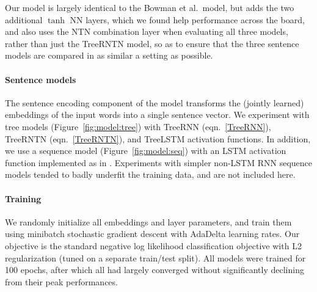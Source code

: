 Our model is largely identical to the Bowman et al.~model, but adds the two additional $\tanh$ NN layers, which we found help performance across the board, and also uses the NTN combination layer when evaluating all three models, rather than just the TreeRNTN model, so as to ensure that the three sentence models are compared in as similar a setting as possible.

\paragraph{Sentence models}
The sentence encoding component of the model transforms the (jointly learned) embeddings of the input words into a single sentence vector. We experiment with tree models (Figure~\ref{fig:model:tree}) with TreeRNN (eqn.~\ref{TreeRNN}), TreeRNTN (eqn.~\ref{TreeRNTN}), and TreeLSTM \cite{tai2015improved} activation functions. In addition, we use a sequence model (Figure~\ref{fig:model:seq}) with an LSTM activation function \cite{hochreiter1997long} implemented as in . Experiments with simpler non-LSTM RNN sequence models tended to badly underfit the training data, and are not included here.

\paragraph{Training} We randomly initialize all embeddings and layer parameters, and train them using minibatch stochastic gradient descent with AdaDelta \cite{zeiler2012adadelta} learning rates. Our objective is the standard negative log likelihood classification objective with L2 regularization (tuned on a separate train/test split). All models were trained for 100 epochs, after which all had largely converged without significantly declining from their peak performances.

